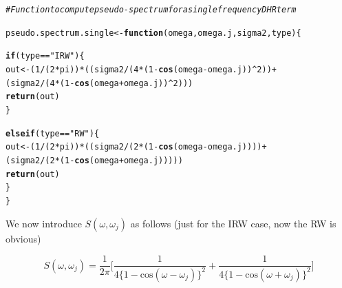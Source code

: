\documentclass{article}\usepackage[]{graphicx}\usepackage[]{color}
\makeatletter
\newcommand{\hlnum}[1]{\textcolor[rgb]{0.686,0.059,0.569}{#1}}%
\newcommand{\hlstr}[1]{\textcolor[rgb]{0.192,0.494,0.8}{#1}}%
\newcommand{\hlcom}[1]{\textcolor[rgb]{0.678,0.584,0.686}{\textit{#1}}}%
\newcommand{\hlopt}[1]{\textcolor[rgb]{0,0,0}{#1}}%
\newcommand{\hlstd}[1]{\textcolor[rgb]{0.345,0.345,0.345}{#1}}%
\newcommand{\hlkwa}[1]{\textcolor[rgb]{0.161,0.373,0.58}{\textbf{#1}}}%
\newcommand{\hlkwb}[1]{\textcolor[rgb]{0.69,0.353,0.396}{#1}}%
\newcommand{\hlkwc}[1]{\textcolor[rgb]{0.333,0.667,0.333}{#1}}%
\newcommand{\hlkwd}[1]{\textcolor[rgb]{0.737,0.353,0.396}{\textbf{#1}}}%
\newenvironment{kframe}{%
 \def\at@end@of@kframe{}%
 \ifinner\ifhmode%
  \def\at@end@of@kframe{\end{minipage}}%
  \begin{minipage}{\columnwidth}%
 \fi\fi%
 \def\FrameCommand##1{\hskip\@totalleftmargin \hskip-\fboxsep
 \colorbox{shadecolor}{##1}\hskip-\fboxsep
     \hskip-\linewidth \hskip-\@totalleftmargin \hskip\columnwidth}%
 \MakeFramed {\advance\hsize-\width
   \@totalleftmargin\z@ \linewidth\hsize
   \@setminipage}}%
 {\par\unskip\endMakeFramed%
 \at@end@of@kframe}
\newenvironment{knitrout}{}{} %
\makeatother
\begin{document}
\begin{knitrout}\footnotesize
{}\color{fgcolor}\begin{kframe}
\begin{alltt}
\hlcom{# Function to compute pseudo-spectrum for a single frequency DHR term}

\hlstd{pseudo.spectrum.single} \hlkwb{<-} \hlkwa{function}\hlstd{(}\hlkwc{omega}\hlstd{,} \hlkwc{omega.j}\hlstd{,} \hlkwc{sigma2}\hlstd{,} \hlkwc{type}\hlstd{) \{}

  \hlkwa{if}\hlstd{(type} \hlopt{==} \hlstr{"IRW"}\hlstd{) \{}
    \hlstd{out} \hlkwb{<-} \hlstd{(}\hlnum{1}\hlopt{/}\hlstd{(}\hlnum{2}\hlopt{*}\hlstd{pi))} \hlopt{*} \hlstd{((sigma2}\hlopt{/}\hlstd{(}\hlnum{4}\hlopt{*}\hlstd{(}\hlnum{1} \hlopt{-} \hlkwd{cos}\hlstd{(omega} \hlopt{-} \hlstd{omega.j))}\hlopt{^}\hlnum{2}\hlstd{))} \hlopt{+}
                           \hlstd{(sigma2}\hlopt{/}\hlstd{(}\hlnum{4}\hlopt{*}\hlstd{(}\hlnum{1} \hlopt{-} \hlkwd{cos}\hlstd{(omega} \hlopt{+} \hlstd{omega.j))}\hlopt{^}\hlnum{2}\hlstd{)))}
    \hlkwd{return}\hlstd{(out)}
  \hlstd{\}}

  \hlkwa{else if}\hlstd{(type} \hlopt{==} \hlstr{"RW"}\hlstd{) \{}
    \hlstd{out} \hlkwb{<-} \hlstd{(}\hlnum{1}\hlopt{/}\hlstd{(}\hlnum{2}\hlopt{*}\hlstd{pi))} \hlopt{*} \hlstd{((sigma2}\hlopt{/}\hlstd{(}\hlnum{2}\hlopt{*}\hlstd{(}\hlnum{1} \hlopt{-} \hlkwd{cos}\hlstd{(omega} \hlopt{-} \hlstd{omega.j))))} \hlopt{+}
                           \hlstd{(sigma2}\hlopt{/}\hlstd{(}\hlnum{2}\hlopt{*}\hlstd{(}\hlnum{1} \hlopt{-} \hlkwd{cos}\hlstd{(omega} \hlopt{+} \hlstd{omega.j)))))}
    \hlkwd{return}\hlstd{(out)}
  \hlstd{\}}
\hlstd{\}}
\end{alltt}
\end{kframe}
\end{knitrout}

\vspace{0.3cm}

We now introduce $S(\omega, \omega_j)$ as follows (just for the IRW case, now the RW is obvious)


\begin{equation*}
S(\omega, \omega_j) = \dfrac{1}{2\pi} \Big[ \dfrac{1}{4\{ 1 - \text{cos}(\omega - \omega_j)\}^2} + \dfrac{1}{4\{ 1 - \text{cos}(\omega + \omega_j)\}^2}\Big]
\end{equation*}
\end{document}
